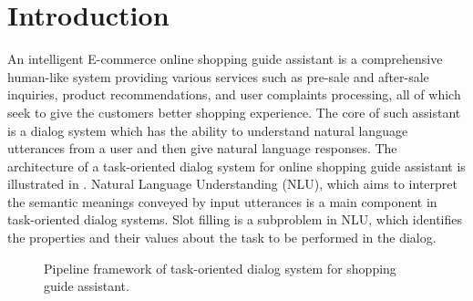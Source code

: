 \section{Introduction}
\label{sec:intro}

%
An intelligent E-commerce online shopping guide assistant
is a comprehensive human-like system providing various services
such as pre-sale and after-sale inquiries, product recommendations,
and user complaints processing,
all of which seek to give the customers better shopping experience.
The core of such assistant is a dialog system which 
has the ability to understand natural language utterances
from a user and then give natural language responses.
The architecture of a task-oriented dialog system
for online shopping guide assistant is illustrated in .
Natural Language Understanding (NLU), which aims to 
interpret the semantic meanings conveyed by input utterances
is a main component in task-oriented dialog systems. 
Slot filling is a subproblem in NLU, which identifies
the properties and their values about the task to be performed in
the dialog.

\begin{figure}[h]
	\centering
	\caption{Pipeline framework of task-oriented dialog system for shopping guide assistant.}
	\label{fig:dialog-system}
	\vspace{-10pt}
\end{figure}

